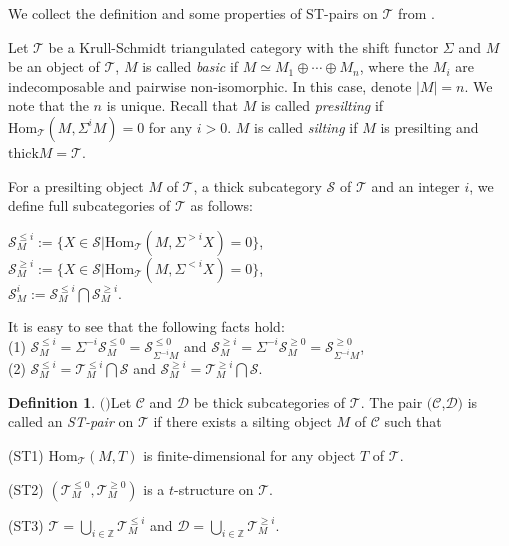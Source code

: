 \documentclass[11pt,a4paper]{amsart}
\numberwithin{equation}{section} \theoremstyle{plain}
\numberwithin{equation}{section} \theoremstyle{definition}
\newtheorem{definition}[lem]{Definition}
\newenvironment{df}{\begin{definition}\rm}{\end{definition}}
\begin{document}
We collect the definition and some properties of ST-pairs on $\mathcal{T}$ from \cite{AMY}.

Let $\mathcal{T}$ be a Krull-Schmidt triangulated category with the shift functor $\Sigma$ and $M$ be an object of $\mathcal{T}$, $M$ is called \emph{basic} if $M\simeq M_{1}\oplus \cdots\oplus M_{n}$, where the $M_{i}$ are indecomposable and pairwise non-isomorphic. In this case, denote $|M|=n$. We note that the $n$ is unique. Recall that $M$ is called \emph{presilting} if $\mathrm{Hom}_{\mathcal{T}}(M,\Sigma^{i}M)=0$ for any $i>0$. $M$ is called \emph{silting} if $M$ is presilting and $\mathrm{thick}M=\mathcal{T}$.

For a presilting object $M$ of $\mathcal{T}$, a thick subcategory $\mathcal{S}$ of $\mathcal{T}$ and an integer $i$, we define full subcategories of $\mathcal{T}$ as follows:
\begin{center}
$\mathcal{S}_{M}^{\leq i}:=\{X\in\mathcal{S} | \mathrm{Hom}_{\mathcal{T}}(M,\Sigma^{>i}X)=0\}$,\\
$\mathcal{S}_{M}^{\geq i}:=\{X\in\mathcal{S} | \mathrm{Hom}_{\mathcal{T}}(M,\Sigma^{<i}X)=0\}$,\\
$\mathcal{S}_{M}^{ i}:=\mathcal{S}_{M}^{\leq i}\bigcap\mathcal{S}_{M}^{\geq i}$.
\end{center}
It is easy to see that the following facts hold:\\ (1) $\mathcal{S}_{M}^{\leq i}=\Sigma^{-i}\mathcal{S}_{M}^{\leq 0}=\mathcal{S}_{\Sigma^{-i}M}^{\leq 0}$ and $\mathcal{S}_{M}^{\geq i}=\Sigma^{-i}\mathcal{S}_{M}^{\geq 0}=\mathcal{S}_{\Sigma^{-i}M}^{\geq 0}$,\\
(2) $\mathcal{S}_{M}^{\leq i}=\mathcal{T}_{M}^{\leq i}\bigcap\mathcal{S}$ and $\mathcal{S}_{M}^{\geq i}=\mathcal{T}_{M}^{\geq i}\bigcap\mathcal{S}$.

\begin{df}$($\cite[Definition 4.3]{AMY}$)$\label{dfn2} Let $\mathcal{C}$ and $\mathcal{D}$ be thick subcategories of $\mathcal{T}$. The pair $(\mathcal{C}$,$\mathcal{D})$ is called an \emph{ST-pair} on $\mathcal{T}$ if there exists a silting object $M$ of $\mathcal{C}$ such that

(ST1) $\mathrm{Hom}_{\mathcal{T}}(M,T)$ is finite-dimensional for any object $T$ of $\mathcal{T}$.

(ST2) $(\mathcal{T}_{M}^{\leq0},\mathcal{T}_{M}^{\geq0})$ is a $t$-structure on $\mathcal{T}$.

(ST3) $\mathcal{T}=\bigcup_{i\in\mathbb{Z}}\mathcal{T}_{M}^{\leq i}$ and $\mathcal{D}=\bigcup_{i\in\mathbb{Z}}\mathcal{T}_{M}^{\geq i}$.
\end{df}
\end{document}
